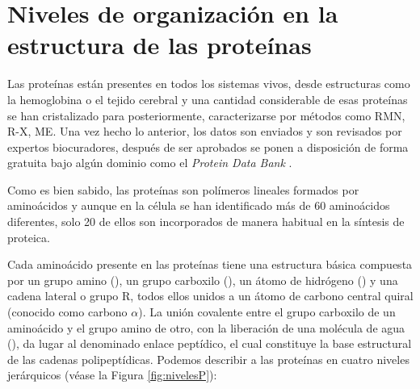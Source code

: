  
 
\section{Niveles de organizaci\'{o}n en la estructura de las prote\'{i}nas}
\label{sec:noep}

Las prote\'{i}nas est\'{a}n presentes en todos los sistemas vivos, desde estructuras como la hemoglobina o el tejido cerebral y una cantidad considerable de esas prote\'{i}nas se han cristalizado para
posteriormente, caracterizarse por m\'{e}todos como RMN, R-X, ME. Una vez hecho lo anterior, los datos son enviados y son revisados por expertos biocuradores, despu\'{e}s de
ser aprobados se ponen a disposici\'{o}n de forma gratuita bajo alg\'{u}n dominio como el \textit{Protein Data Bank} \cite{bib:Pdb-bank}.

Como es bien sabido, las prote\'{i}nas son pol\'{i}meros lineales formados por amino\'{a}cidos y aunque en la c\'{e}lula se han identificado m\'{a}s de 60 amino\'{a}cidos diferentes, solo 20 de ellos son incorporados de manera habitual en la s\'{i}ntesis de proteica.

Cada amino\'{a}cido presente en las proteínas tiene una estructura b\'{a}sica compuesta por un grupo amino (), un grupo carboxilo (), un \'{a}tomo de hidr\'{o}geno () y una cadena lateral o grupo R, todos ellos unidos a un \'{a}tomo de carbono central quiral (conocido como carbono $\alpha$). La uni\'{o}n covalente entre el grupo carboxilo de un amino\'{a}cido y el grupo amino de otro, con la liberaci\'{o}n de una mol\'{e}cula de agua (), da lugar al denominado enlace pept\'{i}dico, el cual constituye la base estructural de las cadenas polipept\'{i}dicas. Podemos describir a las prote\'{i}nas en cuatro niveles jer\'{a}rquicos (v\'{e}ase la Figura \ref{fig:nivelesP}):

